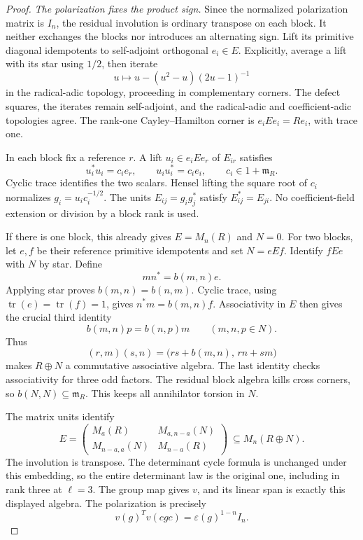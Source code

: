 \begin{proof}
\emph{The polarization fixes the product sign.}
Since the normalized polarization matrix is \(I_n\), the
residual involution is ordinary transpose on each block.
It neither exchanges the blocks nor introduces an alternating
sign.  Lift its primitive diagonal idempotents to self-adjoint
orthogonal \(e_i\in E\).  Explicitly, average a lift with its
star using \(1/2\), then iterate
\[
                     u\longmapsto u-(u^2-u)(2u-1)^{-1}
\]
in the radical-adic topology, proceeding in complementary
corners.  The defect squares, the iterates remain self-adjoint,
and the radical-adic and coefficient-adic topologies agree.
The rank-one Cayley--Hamilton corner is \(e_iEe_i=Re_i\),
with trace one.

In each block fix a reference \(r\).  A lift \(u_i\in e_iEe_r\)
of \(E_{ir}\) satisfies
\[
 u_i^*u_i=c_ie_r,\qquad u_iu_i^*=c_ie_i,\qquad c_i\in1+\mathfrak m_R.
\]
Cyclic trace identifies the two scalars.  Hensel lifting the
square root of \(c_i\) normalizes \(g_i=u_ic_i^{-1/2}\).
The units \(E_{ij}=g_ig_j^*\) satisfy \(E_{ij}^*=E_{ji}\).
No coefficient-field extension or division by a block rank is used.

If there is one block, this already gives \(E=M_n(R)\) and
\(N=0\).  For two blocks, let \(e,f\) be their reference
primitive idempotents and set \(N=eEf\).
Identify \(fEe\) with \(N\) by star.  Define
\[
                         mn^*=b(m,n)e.
\]
Applying star proves \(b(m,n)=b(n,m)\).  Cyclic trace, using
\(\operatorname{tr}(e)=\operatorname{tr}(f)=1\), gives
\(n^*m=b(m,n)f\).  Associativity in \(E\) then gives the crucial
third identity
\[
                         b(m,n)p=b(n,p)m\qquad(m,n,p\in N).
\]
Thus
\[
 (r,m)(s,n)=\bigl(rs+b(m,n),\,rn+sm\bigr)
\]
makes \(R\oplus N\) a commutative associative algebra.
The last identity checks associativity for three odd factors.
The residual block algebra kills cross corners, so
\(b(N,N)\subseteq\mathfrak m_R\).
This keeps all annihilator torsion in \(N\).

The matrix units identify
\[
 E=
 \begin{pmatrix}
 M_a(R)&M_{a,n-a}(N)\\
 M_{n-a,a}(N)&M_{n-a}(R)
 \end{pmatrix}
 \ \subseteq M_n(R\oplus N).
\]
The involution is transpose.  The determinant cycle formula is
unchanged under this embedding, so the entire determinant law is
the original one, including in rank three at \(\ell=3\).
The group map gives \(v\), and its linear span is exactly this
displayed algebra.  The polarization is precisely
\[
                    v(g)^Tv(cgc)=\varepsilon(g)^{1-n}I_n.
\]


\end{proof}
